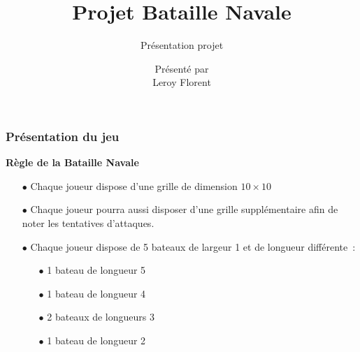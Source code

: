 \documentclass{beamer}
\begin{document}
\title[Stage
]
{Projet Bataille Navale}

\subtitle{Présentation projet}

\author[Leroy Florent]{
  Présenté par \\
  Leroy Florent
}

\institute[]
{}

\date[20 juin 2024]
{}

\frame{\titlepage}


\begin{frame}
  \frametitle{Présentation du jeu}
  \begin{minipage}[t]{0.48\linewidth}
    \textbf{Règle de la Bataille Navale}
    \begin{itemize}
      \item [$\bullet$] Chaque joueur dispose d'une grille de dimension $10
              \times 10$
      \item [$\bullet$] Chaque joueur pourra aussi disposer d'une grille
            supplémentaire afin de noter les tentatives d'attaques.
      \item [$\bullet$] Chaque joueur dispose de 5 bateaux de
            largeur 1 et de longueur différente :
            \begin{itemize}
              \item[$\bullet$] 1 bateau de longueur 5
              \item[$\bullet$] 1 bateau de longueur 4
              \item[$\bullet$] 2 bateaux de longueurs 3
              \item[$\bullet$] 1 bateau de longueur 2
            \end{itemize}
    \end{itemize}
  \end{minipage}\hfill
  \begin{minipage}[t]{0.48\linewidth}
    \begin{figure}[H]
      \centering

\end{figure}
\end{minipage}
\end{frame}
\end{document}
